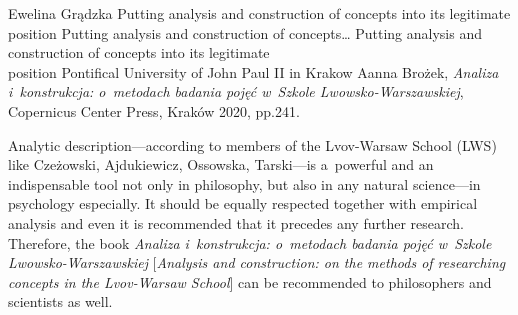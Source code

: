 \begin{newrevengenv}{Ewelina Grądzka}
	{Putting analysis and construction of concepts into its legitimate position}
	{Putting analysis and construction of concepts\ldots}
	{Putting analysis and construction of concepts into its legitimate\\position}
	{Pontifical University of John Paul II in Krakow}
	{Aanna Brożek, \textit{Analiza i~konstrukcja: o~metodach badania pojęć w~Szkole Lwowsko-Warszawskiej}, Copernicus Center Press, Kraków 2020, pp.241.}
	
	



\lettrine[loversize=0.13,lines=2,lraise=-0.03,nindent=0em,findent=0.2pt]%
{A}{}nalytic description---according to members of the Lvov-Warsaw School (LWS) like Czeżowski, Ajdukiewicz, Ossowska, Tarski---is a~powerful and an indispensable tool not only in philosophy, but also in any natural science---in psychology especially. It should be equally respected together with empirical analysis and even it is recommended that it precedes any further research. Therefore, the book \textit{Analiza i~konstrukcja: o~metodach badania pojęć w~Szkole Lwowsko-Warszawskiej} [\textit{Analysis and construction: on the methods of researching concepts in the Lvov-Warsaw School}] can be recommended to philosophers and scientists as well.


\end{newrevengenv}
